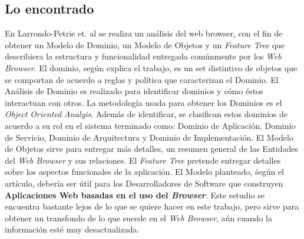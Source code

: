 \subsection{Lo encontrado}
En Larrondo-Petrie et. al \cite{535061} se realiza un análisis del web browser, con el fin de obtener un Modelo de Dominio, un Modelo de Objetos y un \textit{Feature Tree} que describiera la estructura y funcionalidad entregada comúnmente por los \textit{Web Browser}. El dominio, según explica el trabajo, es un set distintivo de objetos que se comportan de acuerdo a reglas y política que caracterizan el Dominio. El Análisis de Dominio es realizado para identificar dominios y cómo éstos interactuan con otros. La metodología usada para obtener los Dominios es el \textit{Object Oriented Analyis}. Además de identificar, se clasifican estos dominios de acuerdo a su rol en el sistema terminado como: Dominio de Aplicación, Dominio de Servicio, Dominio de Arquitectura y Dominio de Implementación. El Modelo de Objetos sirve para entregar más detalles, un resumen general de las Entidades del \textit{Web Browser} y sus relaciones. El \textit{Feature Tree} pretende entregar detalles sobre los aspectos funcionales de la aplicación. El Modelo planteado, śegún el artículo, debería ser útil para los Desarrolladores de Software que construyen \textbf{Aplicaciones Web basadas en el uso del \textit{Browser}}.  Este estudio se encuentra bastante lejos de lo que se quiere hacer en este trabajo, pero sirve para obtener un transfondo de lo que sucede en el \textit{\textit{Web Browser}}, aún cuando la información esté muy desactualizada.


